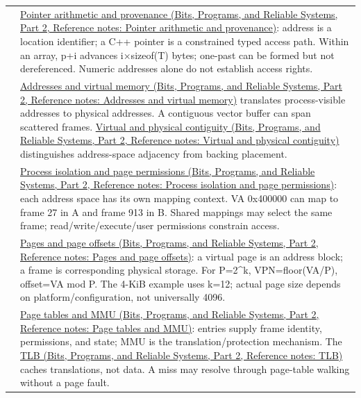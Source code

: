 {\begin{longtable}[]{@{}
  >{\raggedright\arraybackslash}p{}
  >{\raggedright\arraybackslash}p{}@{}}
51 & \href{../01-Bits-Programs-and-Reliable-Systems-P02/main.pdf\#nameddest=appendix-6af5921bc853}{Pointer arithmetic and provenance (Bits, Programs, and Reliable Systems, Part 2, Reference notes: Pointer arithmetic and provenance)}: address is a location identifier; a C++ pointer is a constrained typed access path. Within an array, p+i advances i×sizeof(T) bytes; one-past can be formed but not dereferenced. Numeric addresses alone do not establish access rights. \\
52 & \href{../01-Bits-Programs-and-Reliable-Systems-P02/main.pdf\#nameddest=appendix-18ee4f913c3c}{Addresses and virtual memory (Bits, Programs, and Reliable Systems, Part 2, Reference notes: Addresses and virtual memory)} translates process-visible addresses to physical addresses. A contiguous vector buffer can span scattered frames. \href{../01-Bits-Programs-and-Reliable-Systems-P02/main.pdf\#nameddest=appendix-f897c1ddac8f}{Virtual and physical contiguity (Bits, Programs, and Reliable Systems, Part 2, Reference notes: Virtual and physical contiguity)} distinguishes address-space adjacency from backing placement. \\
53 & \href{../01-Bits-Programs-and-Reliable-Systems-P02/main.pdf\#nameddest=appendix-c2a9ad1e2b49}{Process isolation and page permissions (Bits, Programs, and Reliable Systems, Part 2, Reference notes: Process isolation and page permissions)}: each address space has its own mapping context. VA 0x400000 can map to frame 27 in A and frame 913 in B. Shared mappings may select the same frame; read/write/execute/user permissions constrain access. \\
54 & \href{../01-Bits-Programs-and-Reliable-Systems-P02/main.pdf\#nameddest=appendix-0c67cd5bf30a}{Pages and page offsets (Bits, Programs, and Reliable Systems, Part 2, Reference notes: Pages and page offsets)}: a virtual page is an address block; a frame is corresponding physical storage. For P=2\^{}k, VPN=floor(VA/P), offset=VA mod P. The 4-KiB example uses k=12; actual page size depends on platform/configuration, not universally 4096. \\
55 & \href{../01-Bits-Programs-and-Reliable-Systems-P02/main.pdf\#nameddest=appendix-01e5905165c4}{Page tables and MMU (Bits, Programs, and Reliable Systems, Part 2, Reference notes: Page tables and MMU)}: entries supply frame identity, permissions, and state; MMU is the translation/protection mechanism. The \href{../01-Bits-Programs-and-Reliable-Systems-P02/main.pdf\#nameddest=appendix-7a2d9c5ce511}{TLB (Bits, Programs, and Reliable Systems, Part 2, Reference notes: TLB)} caches translations, not data. A miss may resolve through page-table walking without a page fault. \\

\end{longtable}}
